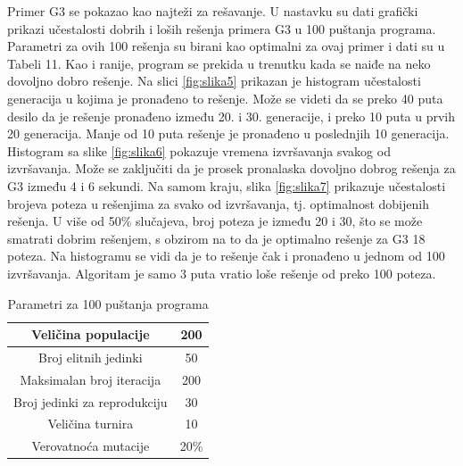 \documentclass[12pt]{article}
\begin{document}
\vspace*{3\baselineskip}
Primer G3 se pokazao kao najteži za rešavanje. U nastavku su dati grafički prikazi učestalosti dobrih i loših rešenja primera G3 u 100 puštanja programa. Parametri za ovih 100 rešenja su birani kao optimalni za ovaj primer i dati su u Tabeli 11. Kao i ranije, program se prekida u trenutku kada se naiđe na neko dovoljno dobro rešenje. Na slici \ref{fig:slika5} prikazan je histogram učestalosti generacija u kojima je pronađeno to rešenje. Može se videti da se preko 40 puta desilo da je rešenje pronađeno između 20. i 30. generacije, i preko 10 puta u prvih 20 generacija. Manje od 10 puta rešenje je pronađeno u poslednjih 10 generacija. Histogram sa slike  \ref{fig:slika6} pokazuje vremena izvršavanja svakog od izvršavanja. Može se zaključiti da je prosek pronalaska dovoljno dobrog rešenja za G3 između 4 i 6 sekundi. Na samom kraju, slika \ref{fig:slika7} prikazuje učestalosti brojeva poteza u rešenjima za svako od izvršavanja, tj. optimalnost dobijenih rešenja. U više od 50\% slučajeva, broj poteza je između 20 i 30, što se može smatrati dobrim rešenjem, s obzirom na to da je optimalno rešenje za G3 18 poteza. Na histogramu se vidi da je to rešenje čak i pronađeno u jednom od 100 izvršavanja. Algoritam je samo 3 puta vratio loše rešenje od preko 100 poteza.

	\begin {table}[H]
\begin{center}
	\caption {Parametri za 100 puštanja programa} \label{tab:title} 
	\begin{tabular}{|| c|c ||} 	
		\hline\hline
		Veličina populacije &  200   \\ 
		\hline
		Broj elitnih jedinki & 50   \\
		\hline
		Maksimalan broj iteracija & 200   \\
		\hline
		Broj jedinki za reprodukciju  & 30   \\
		\hline
		Veličina turnira & 10   \\
		\hline
		Verovatnoća mutacije & 20\%  \\ 
		\hline
	\end{tabular}
\end{center}
\end{table}
\end{document}
